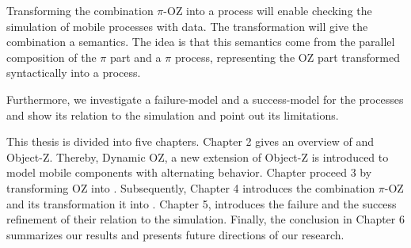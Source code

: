  Transforming the combination $\pi$-OZ into a \picalc{} process will enable checking the simulation of mobile processes with data. The transformation will give the combination a \picalc{} semantics. The idea is that this semantics come from the parallel composition of the $\pi$ part and a $\pi$ process, representing the OZ part transformed syntactically into a \picalc{} process.

 Furthermore, we investigate a failure-model and a success-model for the \picalc{} processes and show its relation to the simulation and point out its limitations.

This thesis is divided into five chapters. Chapter 2 gives an overview of \picalc{} and Object-Z. Thereby, Dynamic OZ, a new extension of Object-Z is introduced to model mobile components with alternating behavior. Chapter proceed 3 by transforming OZ into \picalc{}. Subsequently, Chapter 4 introduces the combination $\pi$-OZ and its transformation it into \picalc{}. Chapter 5, introduces the failure and the success refinement of \picalc{} their relation to the simulation. Finally, the conclusion in Chapter 6 summarizes our results and presents future directions of our research.

